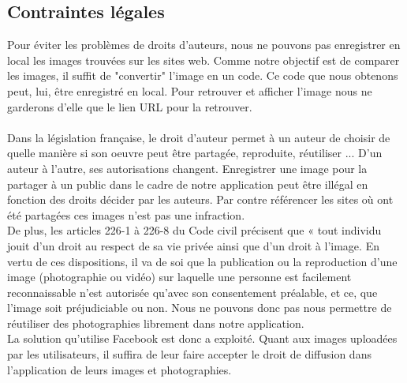 \documentclass[a4paper,12pt]{article}
\begin{document}
\subsection{Contraintes légales}
Pour éviter les problèmes de droits d'auteurs, nous ne pouvons pas enregistrer en local les images trouvées sur les sites web. Comme notre objectif est de comparer les images, il suffit de "convertir" l'image en un code. Ce code que nous obtenons peut, lui, être enregistré en local. Pour retrouver et afficher l'image nous ne garderons d'elle que le lien URL pour la retrouver. \\ \\
Dans la législation française, le droit d'auteur permet à un auteur de choisir de quelle manière si son oeuvre peut être partagée, reproduite, réutiliser ... D'un auteur à l'autre, ses autorisations changent. Enregistrer une image pour la partager à un public dans le cadre de notre application peut être illégal en fonction des droits décider par les auteurs. Par contre référencer les sites où ont été partagées ces images n'est pas une infraction. \\ 
De plus, les articles 226-1 à 226-8 du Code civil précisent que « tout individu jouit d’un droit au respect de sa vie privée ainsi que d’un droit à l’image. En vertu de ces dispositions, il va de soi que la publication ou la reproduction d’une image (photographie ou vidéo) sur laquelle une personne est facilement reconnaissable n’est autorisée qu’avec son consentement préalable, et ce, que l’image soit préjudiciable ou non. Nous ne pouvons donc pas nous permettre de réutiliser des photographies librement dans notre application. \\ 
La solution qu'utilise Facebook est donc a exploité. Quant aux images uploadées par les utilisateurs, il suffira de leur faire accepter le droit de diffusion dans l'application de leurs images et photographies. 

\newpage
{}
\end{document}
